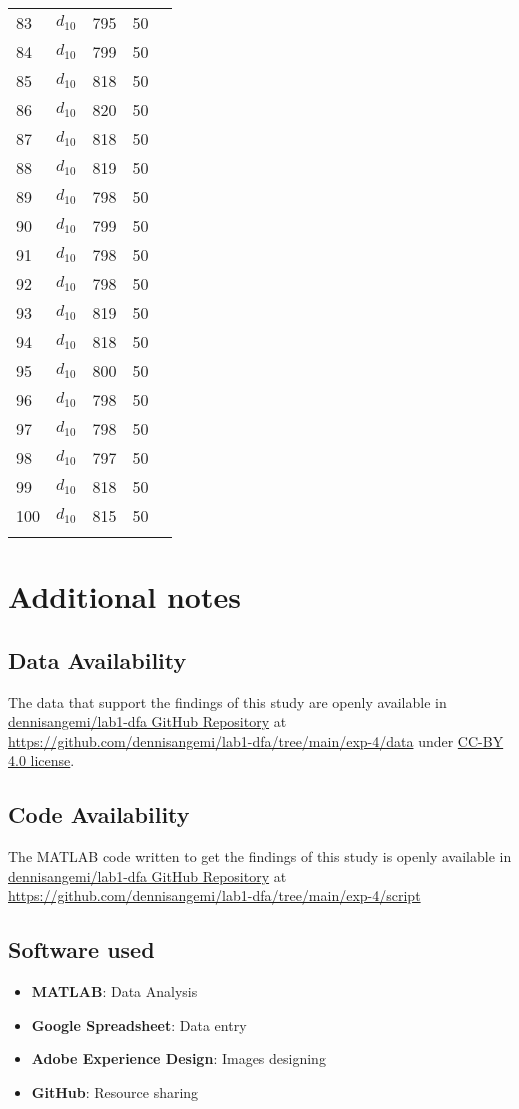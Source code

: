 \documentclass[11pt,a4paper]{article}
\begin{document}
\begin{longtable}[]{@{}lllll@{}}
    83 & $d_{10}$ & 795 & 50 \tabularnewline
    84 & $d_{10}$ & 799 & 50 \tabularnewline
    85 & $d_{10}$ & 818 & 50 \tabularnewline
    86 & $d_{10}$ & 820 & 50 \tabularnewline
    87 & $d_{10}$ & 818 & 50 \tabularnewline
    88 & $d_{10}$ & 819 & 50 \tabularnewline
    89 & $d_{10}$ & 798 & 50 \tabularnewline
    90 & $d_{10}$ & 799 & 50 \tabularnewline
    91 & $d_{10}$ & 798 & 50 \tabularnewline
    92 & $d_{10}$ & 798 & 50 \tabularnewline
    93 & $d_{10}$ & 819 & 50 \tabularnewline
    94 & $d_{10}$ & 818 & 50 \tabularnewline
    95 & $d_{10}$ & 800 & 50 \tabularnewline
    96 & $d_{10}$ & 798 & 50 \tabularnewline
    97 & $d_{10}$ & 798 & 50 \tabularnewline
    98 & $d_{10}$ & 797 & 50 \tabularnewline
    99 & $d_{10}$ & 818 & 50 \tabularnewline
    100 & $d_{10}$ & 815 & 50 \tabularnewline
    \bottomrule
    \label{output3}
\end{longtable}



\section{Additional notes}

\subsection{Data Availability}
The data that support the findings of this study are openly available in \href{https://github.com/dennisangemi/lab1-dfa/tree/main/exp-4/data}{dennisangemi/lab1-dfa GitHub Repository} at \href{https://github.com/dennisangemi/lab1-dfa/tree/main/exp-4/data}{https://github.com/dennisangemi/lab1-dfa/tree/main/exp-4/data} under \href{https://creativecommons.org/licenses/by/4.0/}{CC-BY 4.0 license}.

\subsection{Code Availability}
The MATLAB code written to get the findings of this study is openly available in \href{https://github.com/dennisangemi/lab1-dfa/tree/main/exp-2/script}{dennisangemi/lab1-dfa GitHub Repository} at \href{https://github.com/dennisangemi/lab1-dfa/tree/main/exp-4/script}{https://github.com/dennisangemi/lab1-dfa/tree/main/exp-4/script}


\subsection{Software used}
\begin{itemize}
\item
  \textbf{MATLAB}: Data Analysis
\item
  \textbf{Google Spreadsheet}: Data entry
\item
  \textbf{Adobe Experience Design}: Images designing
\item
  \textbf{GitHub}: Resource sharing
\end{itemize}
\end{document}
